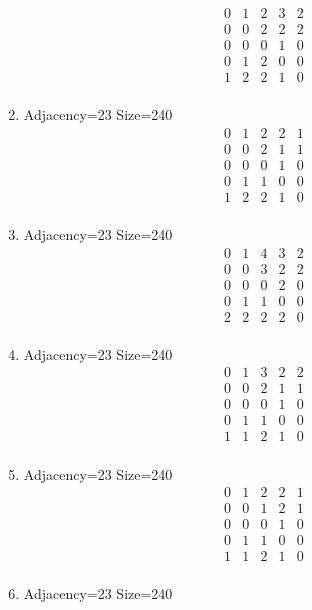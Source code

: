 \documentclass[12pt]{article}
\begin{document}
\begin{multicols}{3}
\begin{enumerate}
\begin{equation*}
\begin{array}{ccccc}
0&1&2&3&2\\
0&0&2&2&2\\
0&0&0&1&0\\
0&1&2&0&0\\
1&2&2&1&0\\
\end{array}
\end{equation*}
\item Adjacency=23 Size=240
\begin{equation*}
\begin{array}{ccccc}
0&1&2&2&1\\
0&0&2&1&1\\
0&0&0&1&0\\
0&1&1&0&0\\
1&2&2&1&0\\
\end{array}
\end{equation*}
\item Adjacency=23 Size=240
\begin{equation*}
\begin{array}{ccccc}
0&1&4&3&2\\
0&0&3&2&2\\
0&0&0&2&0\\
0&1&1&0&0\\
2&2&2&2&0\\
\end{array}
\end{equation*}
\item Adjacency=23 Size=240
\begin{equation*}
\begin{array}{ccccc}
0&1&3&2&2\\
0&0&2&1&1\\
0&0&0&1&0\\
0&1&1&0&0\\
1&1&2&1&0\\
\end{array}
\end{equation*}
\item Adjacency=23 Size=240
\begin{equation*}
\begin{array}{ccccc}
0&1&2&2&1\\
0&0&1&2&1\\
0&0&0&1&0\\
0&1&1&0&0\\
1&1&2&1&0\\
\end{array}
\end{equation*}
\item Adjacency=23 Size=240

\end{enumerate}
\end{multicols}
\end{document}
